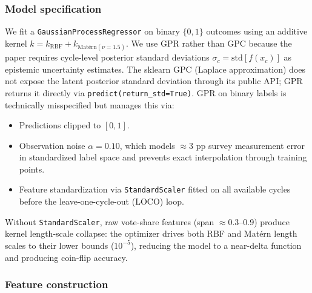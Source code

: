 \documentclass[12pt, letterpaper]{article}
\theoremstyle{definition}
\begin{document}
\subsubsection{Model specification}

We fit a \texttt{GaussianProcessRegressor} on binary $\{0,1\}$ outcomes using
an additive kernel $k = k_{\mathrm{RBF}} + k_{\text{Mat\'ern}(\nu=1.5)}$.
We use GPR rather than GPC because the paper requires cycle-level posterior
standard deviations $\sigma_c = \mathrm{std}[f(x_c)]$ as epistemic uncertainty
estimates. The sklearn GPC (Laplace approximation) does not expose the latent
posterior standard deviation through its public API; GPR returns it directly
via \texttt{predict(return\_std=True)}. GPR on binary labels is technically
misspecified but manages this via:

\begin{itemize}
  \item Predictions clipped to $[0,1]$.
  \item Observation noise $\alpha = 0.10$, which models $\approx$3 pp survey
        measurement error in standardized label space and prevents exact
        interpolation through training points.
  \item Feature standardization via \texttt{StandardScaler} fitted on all
        available cycles before the leave-one-cycle-out (LOCO) loop.
\end{itemize}

Without \texttt{StandardScaler}, raw vote-share features (span $\approx$0.3--0.9)
produce kernel length-scale collapse: the optimizer drives both RBF and
Matérn length scales to their lower bounds ($10^{-5}$), reducing the model
to a near-delta function and producing coin-flip accuracy.

\subsubsection{Feature construction}
\end{document}
